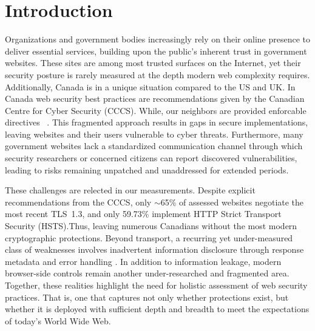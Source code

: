 \documentclass[conference]{IEEEtran}
\begin{document}
\maketitle

\begin{abstract}
\end{abstract}

\begin{IEEEkeywords}
\end{IEEEkeywords}

\section{Introduction}
Organizations and government
bodies increasingly rely on their online presence to deliver essential services, building upon the
public’s inherent trust in government websites. These sites are among most trusted surfaces on the
Internet, yet their security posture is rarely measured at the depth modern web complexity requires. 
Additionally, Canada is in a unique situation compared to the US and UK. In Canada web security best practices 
are recommendations given by the Canadian Centre for Cyber Security (CCCS). While, our neighbors are
 provided enforcable directives ~\cite{omb-m-15-13,cisa_bod_18_01}. 
This fragmented approach results in gaps in secure implementations, leaving websites and their users vulnerable to cyber threats. 
Furthermore, many government websites lack a standardized communication channel through which security 
researchers or concerned citizens can report discovered vulnerabilities, leading to risks remaining unpatched
and unaddressed for extended periods.

These challenges are relected in our measurements. Despite explicit recommendations from the CCCS,
only $\sim$65\% of assessed websites negotiate the most recent TLS~1.3, and only 59.73\% implement
HTTP Strict Transport Security (HSTS).Thus, leaving numerous Canadians without the most modern cryptographic protections.
Beyond transport, a recurring yet under-measured class of weaknesses involves inadvertent information disclosure through response metadata
and error handling \cite{cwe_209}. In addition to information leakage, modern browser-side controls
remain another under-researched and fragmented area. Together, these realities highlight the
 need for holistic assessment of web security practices. That is, one that captures not only whether
  protections exist, but whether it is deployed with sufficient depth and breadth to meet the expectations of today’s World Wide Web. 
\end{document}
